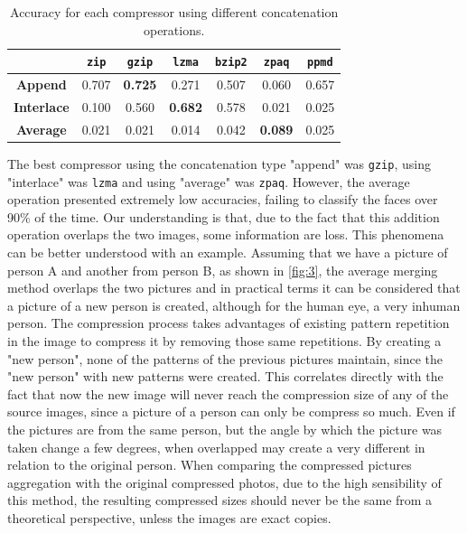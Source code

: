 \documentclass[12pt]{article}
\begin{document}
\begin{table}[h!]
\centering
\begin{tabular}{@{}c|cccccc@{}}
                   & \textbf{\texttt{zip}} & \textbf{\texttt{gzip}} & \textbf{\texttt{lzma}} & \textbf{\texttt{bzip2}} & \textbf{\texttt{zpaq}} & \textbf{\texttt{ppmd}}\\ \midrule
\textbf{Append}    & 0.707     & \textbf{0.725}   & 0.271           & 0.507     & 0.060           & 0.657 \\
\textbf{Interlace} & 0.100     & 0.560            & \textbf{0.682}  & 0.578     & 0.021           & 0.025 \\ 
\textbf{Average}   & 0.021     & 0.021            & 0.014           & 0.042     & \textbf{0.089}  & 0.025 \\ 
\end{tabular}
\vspace{5pt}
\caption{Accuracy for each compressor using different concatenation operations.}
\label{tab:1}
\end{table}

The best compressor using the concatenation type "append" was \texttt{gzip}, using "interlace" was \texttt{lzma} and using "average" was \texttt{zpaq}.
However, the average operation presented extremely low accuracies, failing to classify the faces over 90\% of the time.
Our understanding is that, due to the fact that this addition operation overlaps the two images, some information are loss. This phenomena can be better understood with an example. Assuming that we have a picture of person A and another from person B, as shown in \ref{fig:3}, the average merging method overlaps the two pictures and in practical terms it can be considered that a picture of a new person is created, although for the human eye, a very inhuman person. The compression process takes advantages of existing pattern repetition in the image to compress it by removing those same repetitions. By creating a "new person", none of the patterns of the previous pictures maintain, since the "new person" with new patterns were created. This correlates directly with the fact that now the new image will never reach the compression size of any of the source images, since a picture of a person can only be compress so much. Even if the pictures are from the same person, but the angle by which the picture was taken change a few degrees, when overlapped may create a very different in relation to the original person. When comparing the compressed pictures aggregation with the original compressed photos, due to the high sensibility of this method, the resulting compressed sizes should never be the same from a theoretical perspective, unless the images are exact copies.
\end{document}
